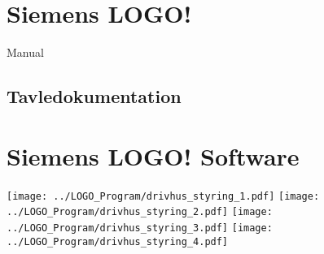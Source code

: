 \section{Siemens LOGO!}

\cite{logo_sm} Manual

\subsection{Tavledokumentation}


\section{Siemens LOGO! Software}
\newpage 
    \texttt{[image: ../LOGO\_Program/drivhus\_styring\_1.pdf]}
\newpage
    \texttt{[image: ../LOGO\_Program/drivhus\_styring\_2.pdf]}
\newpage
    \texttt{[image: ../LOGO\_Program/drivhus\_styring\_3.pdf]}
\newpage
    \texttt{[image: ../LOGO\_Program/drivhus\_styring\_4.pdf]}
%